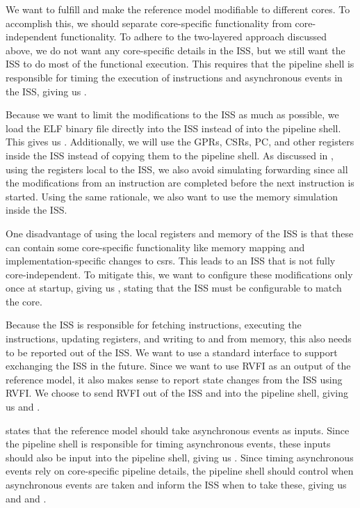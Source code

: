 We want to fulfill  and make the reference model modifiable to different cores. To accomplish this, we should separate core-specific functionality from core-independent functionality. To adhere to the two-layered approach discussed above, we do not want any core-specific details in the ISS, but we still want the ISS to do most of the functional execution. This requires that the pipeline shell is responsible for timing the execution of instructions and asynchronous events in the ISS, giving us . 

Because we want to limit the modifications to the ISS as much as possible, we load the ELF binary file directly into the ISS instead of into the pipeline shell. This gives us . Additionally, we will use the GPRs, CSRs, PC, and other registers inside the ISS instead of copying them to the pipeline shell. As discussed in , using the registers local to the ISS, we also avoid simulating forwarding since all the modifications from an instruction are completed before the next instruction is started. Using the same rationale, we also want to use the memory simulation inside the ISS.

One disadvantage of using the local registers and memory of the ISS is that these can contain some core-specific functionality like memory mapping and imple\-mentation-specific changes to \acrshort{csr}s. This leads to an ISS that is not fully core-independent. To mitigate this, we want to configure these modifications only once at startup, giving us  , stating that the ISS must be configurable to match the core.

Because the ISS is responsible for fetching instructions, executing the instructions, updating registers, and writing to and from memory, this also needs to be reported out of the ISS. We want to use a standard interface to support exchanging the ISS in the future. Since we want to use RVFI as an output of the reference model, it also makes sense to report state changes from the ISS using RVFI. We choose to send RVFI out of the ISS and into the pipeline shell, giving us  and .

 states that the reference model should take asynchronous events as inputs. Since the pipeline shell is responsible for timing asynchronous events, these inputs should also be input into the pipeline shell, giving us . Since timing asynchronous events rely on core-specific pipeline details, the pipeline shell should control when asynchronous events are taken and inform the ISS when to take these, giving us  and  and .

